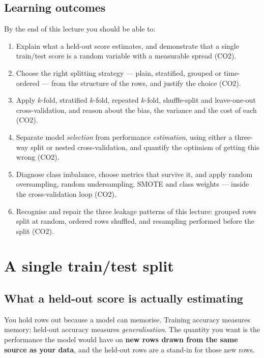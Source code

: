 \documentclass[11pt]{article}
\begin{document}
\subsection{Learning outcomes}

By the end of this lecture you should be able to:

\begin{enumerate}[leftmargin=*]
  \item Explain what a held-out score estimates, and demonstrate that a single
    train/test score is a random variable with a measurable spread (CO2).
  \item Choose the right splitting strategy --- plain, stratified, grouped or
    time-ordered --- from the structure of the rows, and justify the choice
    (CO2).
  \item Apply $k$-fold, stratified $k$-fold, repeated $k$-fold, shuffle-split
    and leave-one-out cross-validation, and reason about the bias, the
    variance and the cost of each (CO2).
  \item Separate model \emph{selection} from performance \emph{estimation},
    using either a three-way split or nested cross-validation, and quantify
    the optimism of getting this wrong (CO2).
  \item Diagnose class imbalance, choose metrics that survive it, and apply
    random oversampling, random undersampling, SMOTE and class weights ---
    inside the cross-validation loop (CO2).
  \item Recognise and repair the three leakage patterns of this lecture:
    grouped rows split at random, ordered rows shuffled, and resampling
    performed before the split (CO2).
\end{enumerate}

\notesources{\AMLUnitIVSources}

\section{A single train/test split}
\label{sec:onesplit}

\subsection{What a held-out score is actually estimating}

You hold rows out because a model can memorise. Training accuracy measures
memory; held-out accuracy measures \emph{generalisation}. The quantity you
want is the performance the model would have on \textbf{new rows drawn from
the same source as your data}, and the held-out rows are a stand-in for those
new rows.
\end{document}
